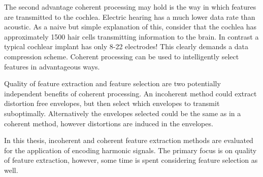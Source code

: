 \documentclass [11pt, proquest,oneside] {ganter_thesis}[2015/03/03]
\begin{document}
The second advantage coherent processing may hold is the way in which features are transmitted to the cochlea.  Electric hearing has a much lower data rate than acoustic.  As a naive but simple explanation of this, consider that the cochlea has approximately 1500 hair cells transmitting information to the brain.  In contrast a typical cochlear implant has only 8-22 electrodes!  This clearly demands a data compression scheme.  Coherent processing can be used to intelligently select features in advantageous ways.

Quality of feature extraction and feature selection are two potentially independent benefits of coherent processing.  An incoherent method could extract distortion free envelopes, but then select which envelopes to transmit suboptimally.  Alternatively the envelopes selected could be the same as in a coherent method, however distortions are induced in the envelopes.

In this thesis, incoherent and coherent feature extraction methods are evaluated for the application of encoding harmonic signals.  The primary focus is on quality of feature extraction, however, some time is spent considering feature selection as well.









\end{document}
